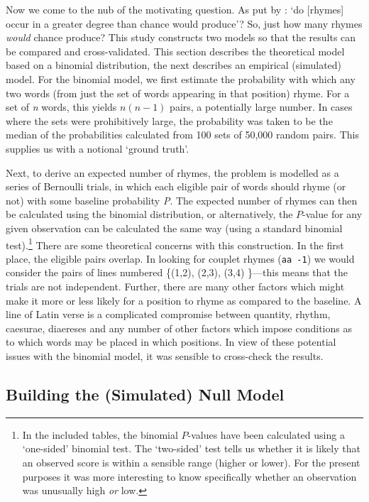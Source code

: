 \documentclass[twocolumn, switch]{article} %
\begin{document}
Now we come to the nub of the motivating question. As put by : `do [rhymes] occur in a greater degree than
chance would produce'? So, just how many rhymes \emph{would} chance produce?
This study constructs two models so that the results can be compared and
cross-validated. This section describes the theoretical model based on a
binomial distribution, the next describes an empirical (simulated) model. For
the binomial model, we first estimate the probability with which any two words
(from just the set of words appearing in that position) rhyme. For a set of
\emph{n} words, this yields $n(n-1)$ pairs, a potentially large number. In
cases where the sets were prohibitively large, the probability was taken to be
the median of the probabilities calculated from 100 sets of 50,000 random
pairs. This supplies us with a notional `ground truth'.

Next, to derive an expected number of rhymes, the problem is modelled as a
series of Bernoulli trials, in which each eligible pair of words should rhyme
(or not) with some baseline probability \emph{P}. The expected number of
rhymes can then be calculated using the binomial distribution, or
alternatively, the $P$-value for any given observation can be calculated the
same way (using a standard binomial test).\footnote{
  In the included tables, the binomial $P$-values have been calculated using a
  `one-sided' binomial test. The `two-sided' test tells us whether it is likely
  that an observed score is within a sensible range (higher or lower). For the
  present purposes it was more interesting to know specifically whether an
  observation was unusually high \emph{or} low.
}
There are some theoretical concerns with this construction. In the first
place, the eligible pairs overlap. In looking for couplet rhymes (\texttt{aa
-1}) we would consider the pairs of lines numbered \{(1,2), (2,3), (3,4)
\textellipsis\}---this means that the trials are not independent. Further,
there are many other factors which might make it more or less likely for a
position to rhyme as compared to the baseline. A line of Latin verse is a
complicated compromise between quantity, rhythm, caesurae, diaereses and any
number of other factors which impose conditions as to which words may be
placed in which positions. In view of these potential issues with the binomial
model, it was sensible to cross-check the results.

\subsection{Building the (Simulated) Null Model} 
\end{document}
